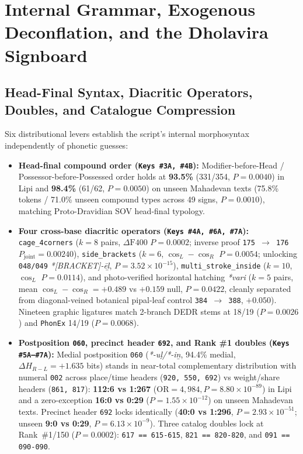 \documentclass[11pt,a4paper]{article}
\begin{document}
\section{Internal Grammar, Exogenous Deconflation, and the Dholavira Signboard}

\subsection{Head-Final Syntax, Diacritic Operators, Doubles, and Catalogue Compression}

Six distributional levers establish the script's internal morphosyntax independently of phonetic guesses:
\begin{itemize}
  \item \textbf{Head-final compound order (\texttt{Keys \#3A, \#4B}):} Modifier-before-Head / Possessor-before-Possessed order holds at \textbf{93.5\%} (331/354, $P = 0.0040$) in Lipi and \textbf{98.4\%} (61/62, $P = 0.0050$) on unseen Mahadevan texts (75.8\% tokens / 71.0\% unseen compound types across 49 signs, $P = 0.0010$), matching Proto-Dravidian SOV head-final typology.
  \item \textbf{Four cross-base diacritic operators (\texttt{Keys \#4A, \#6A, \#7A}):} \texttt{cage\_4corners} ($k=8$ pairs, $\Delta\text{F400}$ $P = 0.0002$; inverse proof \texttt{175 $\to$ 176} $P_{\text{joint}} = 0.00240$), \texttt{side\_brackets} ($k=6$, $\cos_L - \cos_R$ $P = 0.0054$; unlocking \texttt{048/049} \textit{*[BRACKET]-ēḻ}, $P = 3.52 \times 10^{-15}$), \texttt{multi\_stroke\_inside} ($k=10$, $\cos_L$ $P = 0.0114$), and photo-verified horizontal hatching \textit{*vari} ($k=5$ pairs, mean $\cos_L - \cos_R = +0.489$ vs $+0.159$ null, $P = 0.0422$, cleanly separated from diagonal-veined botanical pipal-leaf control \texttt{384 $\to$ 388}, $+0.050$). Nineteen graphic ligatures match 2-branch DEDR stems at 18/19 ($P = 0.0026$) and \texttt{PhonEx} 14/19 ($P = 0.0068$).
  \item \textbf{Postposition \texttt{060}, precinct header \texttt{692}, and Rank \#1 doubles (\texttt{Keys \#5A--\#7A}):} Medial postposition \texttt{060} (\textit{*-uḷ/*-iṉ}, 94.4\% medial, $\Delta H_{R-L} = +1.635$ bits) stands in near-total complementary distribution with numeral \texttt{002} across place/time headers (\texttt{920, 550, 692}) vs weight/share headers (\texttt{861, 817}): \textbf{112:6 vs 1:267} ($\text{OR} = 4{,}984, P = 8.80 \times 10^{-89}$) in Lipi and a zero-exception \textbf{16:0 vs 0:29} ($P = 1.55 \times 10^{-12}$) on unseen Mahadevan texts. Precinct header \texttt{692} locks identically (\textbf{40:0 vs 1:296}, $P = 2.93 \times 10^{-51}$; unseen \textbf{9:0 vs 0:29}, $P = 6.13 \times 10^{-9}$). Three catalog doubles lock at Rank~\#1/150 ($P = 0.0002$): \texttt{617 == 615-615}, \texttt{821 == 820-820}, and \texttt{091 == 090-090}.

\end{itemize}
\end{document}
